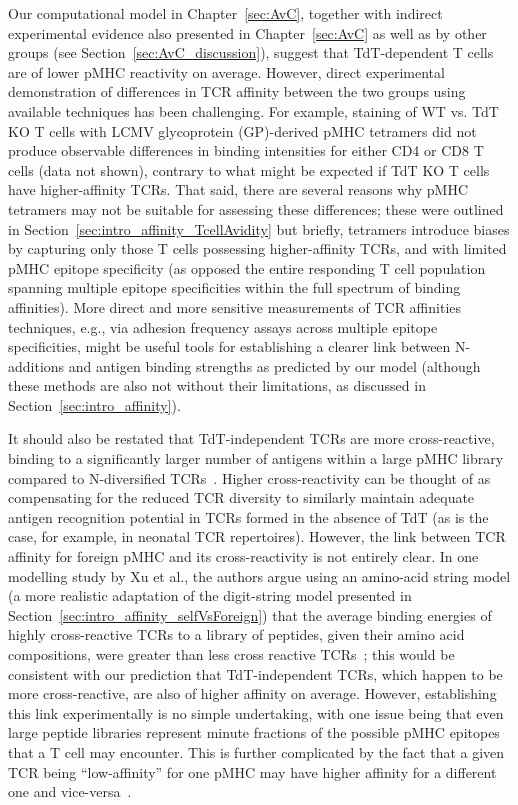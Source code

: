 Our computational model in Chapter~\ref{sec:AvC}, together with indirect experimental evidence also presented in Chapter~\ref{sec:AvC} as well as by other groups (see Section~\ref{sec:AvC_discussion}), suggest that TdT-dependent T cells are of lower pMHC reactivity on average. However, direct experimental demonstration of differences in TCR affinity between the two groups using available techniques has been challenging. For example, staining of WT vs. TdT KO T cells with LCMV glycoprotein (GP)-derived pMHC tetramers did not produce observable differences in binding intensities for either CD4\pos{} or CD8\pos{} T cells (data not shown), contrary to what might be expected if TdT KO T cells have higher-affinity TCRs. That said, there are several reasons why pMHC tetramers may not be suitable for assessing these differences; these were outlined in Section~\ref{sec:intro_affinity_TcellAvidity} but briefly, tetramers introduce biases by capturing only those T cells possessing higher-affinity TCRs, and with limited pMHC epitope specificity (as opposed the entire responding T cell population spanning multiple epitope specificities within the full spectrum of binding affinities). More direct and more sensitive measurements of TCR affinities techniques, e.g., via adhesion frequency assays across multiple epitope specificities, might be useful tools for establishing a clearer link between N-additions and antigen binding strengths as predicted by our model (although these methods are also not without their limitations, as discussed in Section~\ref{sec:intro_affinity}).

It should also be restated that TdT-independent TCRs are more cross-reactive, binding to a significantly larger number of antigens within a large pMHC library compared to N-diversified TCRs~\cite{gavin1995increased}. Higher cross-reactivity can be thought of as compensating for the reduced TCR diversity to similarly maintain adequate antigen recognition potential in TCRs formed in the absence of TdT (as is the case, for example, in neonatal TCR repertoires). However, the link between TCR affinity for foreign pMHC and its cross-reactivity is not entirely clear. In one modelling study by Xu et al., the authors argue using an amino-acid string model (a more realistic adaptation of the digit-string model presented in Section~\ref{sec:intro_affinity_selfVsForeign}) that the average binding energies of highly cross-reactive TCRs to a library of peptides, given their amino acid compositions, were greater than less cross reactive TCRs~\cite{xu2019broad}; this would be consistent with our prediction that TdT-independent TCRs, which happen to be more cross-reactive, are also of higher affinity on average. However, establishing this link experimentally is no simple undertaking, with one issue being that even large peptide libraries represent minute fractions of the possible pMHC epitopes that a T cell may encounter. This is further complicated by the fact that a given TCR being ``low-affinity'' for one pMHC may have higher affinity for a different one and vice-versa~\cite{martinez2015lower}.

